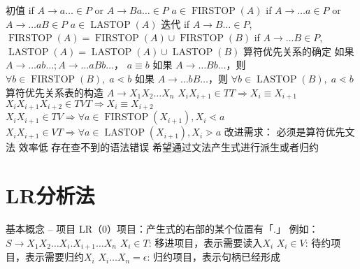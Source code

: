 \documentclass[oneside]{ctexbook}
\DeclareMathOperator{\firstop}{FIRSTOP}
\DeclareMathOperator{\lastop}{LASTOP}
\newcommand*{\tto}[0]{\Rightarrow}
\begin{document}
\begin{outline}
        \2 初值
            \3 if $A \to a \dots \in P$ or $ A \to Ba \dots \in P$
                \4 $a \in \firstop(A)$
            \3 if $A \to \dots a \in P$ or $ A \to  \dots aB \in P$
                \4 $a \in \lastop(A)$
        \2 迭代
            \3 if $A \to B \dots \in P$, $\firstop(A) = \firstop(A) \cup \firstop(B)$
            \3 if $A \to \dots B  \in P$, $\lastop(A) = \lastop(A) \cup \lastop(B)$
    \1 算符优先关系的确定
        \2 如果 $ A \to \dots ab \dots ; A \to \dots aBb \dots$， $a \equiv b$
        \2 如果 $A \to \dots Bb \dots$，则 $\forall b \in \firstop(B),\; a \lessdot b$
        \2 如果 $A \to \dots bB \dots$，则 $\forall b \in \lastop(B),\; a \lessdot b$
    \1 算符优先关系表的构造
        \2 $A \to X_1X_2\dots X_n$
            \3 $X_i X_{i+1} \in TT \tto X_i \equiv X_{i+1}$
            \3 $X_i X_{i+1}X_{i+2} \in TVT \tto X_i \equiv X_{i+2}$
            \3 $X_i X_{i+1} \in TV \tto \forall a \in \firstop(X_{i+1}), X_i \lessdot a$
            \3 $X_i X_{i+1} \in VT \tto \forall a \in \lastop(X_{i+1}), X_i \gtrdot a$
    \1 改进需求：
        \2 必须是算符优先文法
        \2 效率低
        \2 存在查不到的语法错误
        \2 希望通过文法产生式进行派生或者归约
\end{outline}
\section{LR分析法}
\begin{outline}
    \1 基本概念 -- 项目
        \2 LR（0）项目：产生式的右部的某个位置有「.」
        \2 例如： $S \to X_1X_2\dots X_i . X_{i+1} \dots X_n$
        \2 $X_i \in T$: 移进项目，表示需要读入$X_i$
        \2 $X_i \in V$: 待约项目，表示需要归约$X_i$
        \2 $X_i \dots X_n = \epsilon$: 归约项目，表示句柄已经形成

    
\end{outline}
\end{document}
